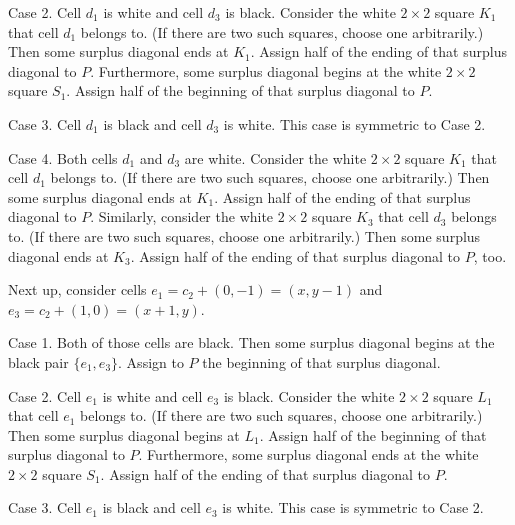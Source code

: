 \documentclass{article}
\begin{document}
Case 2. Cell \(\displaystyle d_1\) is white and cell \(\displaystyle d_3\) is black. Consider the white \(\displaystyle 2 \times 2\) square \(\displaystyle K_1\) that cell \(\displaystyle d_1\) belongs to. (If there are two such squares, choose one arbitrarily.) Then some surplus diagonal ends at \(\displaystyle K_1\). Assign half of the ending of that surplus diagonal to \(\displaystyle P\). Furthermore, some surplus diagonal begins at the white \(\displaystyle 2 \times 2\) square \(\displaystyle S_1\). Assign half of the beginning of that surplus diagonal to \(\displaystyle P\).

Case 3. Cell \(\displaystyle d_1\) is black and cell \(\displaystyle d_3\) is white. This case is symmetric to Case 2.

Case 4. Both cells \(\displaystyle d_1\) and \(\displaystyle d_3\) are white. Consider the white \(\displaystyle 2 \times 2\) square \(\displaystyle K_1\) that cell \(\displaystyle d_1\) belongs to. (If there are two such squares, choose one arbitrarily.) Then some surplus diagonal ends at \(\displaystyle K_1\). Assign half of the ending of that surplus diagonal to \(\displaystyle P\). Similarly, consider the white \(\displaystyle 2 \times 2\) square \(\displaystyle K_3\) that cell \(\displaystyle d_3\) belongs to. (If there are two such squares, choose one arbitrarily.) Then some surplus diagonal ends at \(\displaystyle K_3\). Assign half of the ending of that surplus diagonal to \(\displaystyle P\), too.

Next up, consider cells \(\displaystyle e_1 = c_2 + (0, -1) = (x, y - 1)\) and \(\displaystyle e_3 = c_2 + (1, 0) = (x + 1, y)\).

Case 1. Both of those cells are black. Then some surplus diagonal begins at the black pair \(\displaystyle \{e_1, e_3\}\). Assign to \(\displaystyle P\) the beginning of that surplus diagonal.

Case 2. Cell \(\displaystyle e_1\) is white and cell \(\displaystyle e_3\) is black. Consider the white \(\displaystyle 2 \times 2\) square \(\displaystyle L_1\) that cell \(\displaystyle e_1\) belongs to. (If there are two such squares, choose one arbitrarily.) Then some surplus diagonal begins at \(\displaystyle L_1\). Assign half of the beginning of that surplus diagonal to \(\displaystyle P\). Furthermore, some surplus diagonal ends at the white \(\displaystyle 2 \times 2\) square \(\displaystyle S_1\). Assign half of the ending of that surplus diagonal to \(\displaystyle P\).

Case 3. Cell \(\displaystyle e_1\) is black and cell \(\displaystyle e_3\) is white. This case is symmetric to Case 2.
\end{document}
